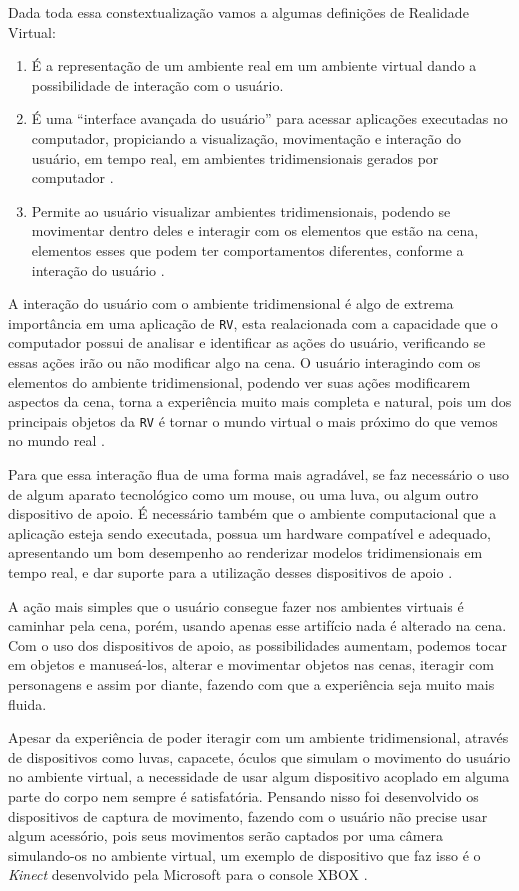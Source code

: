 Dada toda essa constextualização vamos a algumas definições de Realidade Virtual:
\begin{enumerate}
\item É a representação de um ambiente real em um ambiente virtual dando a possibilidade de interação com o usuário.
\item É uma “interface avançada do usuário” para acessar aplicações executadas no computador, propiciando a visualização, movimentação e interação do usuário, em tempo real, em ambientes tridimensionais gerados por computador \cite{kirner2006,kirner2007}.
\item Permite ao usuário visualizar ambientes tridimensionais, podendo se movimentar dentro deles e interagir com os elementos que estão na cena, elementos esses que podem ter comportamentos diferentes, conforme a interação do usuário \cite{kirner2006}.
\end{enumerate}

A interação do usuário com o ambiente tridimensional é algo de extrema importância em uma aplicação de \verb'RV', esta realacionada com a capacidade que o computador possui de analisar e identificar as ações do usuário, verificando se essas ações irão ou não modificar algo na cena. O usuário interagindo com os elementos do ambiente tridimensional, podendo ver suas ações modificarem aspectos da cena, torna a experiência muito mais completa e natural, pois um dos principais objetos da \verb'RV' é tornar o mundo virtual o mais próximo do que vemos no mundo real \cite{kirner2006}.

Para que essa interação flua de uma forma mais agradável, se faz necessário o uso de algum aparato tecnológico como um mouse, ou uma luva, ou algum outro dispositivo de apoio. É necessário também que o ambiente computacional que a aplicação esteja sendo executada, possua um hardware compatível e adequado, apresentando um bom desempenho ao renderizar modelos tridimensionais em tempo real, e dar suporte para a utilização desses dispositivos de apoio \cite{kirner2006}.

A ação mais simples que o usuário consegue fazer nos ambientes virtuais é caminhar pela cena, porém, usando apenas esse artifício nada é alterado na cena. Com o uso dos dispositivos de apoio, as possibilidades aumentam, podemos tocar em objetos e manuseá-los, alterar e movimentar objetos nas cenas, iteragir com personagens e assim por diante, fazendo com que a experiência seja muito mais fluida.

Apesar da experiência de poder iteragir com um ambiente tridimensional, através de dispositivos como luvas, capacete, óculos que simulam o movimento do usuário no ambiente virtual, a necessidade de usar algum dispositivo acoplado em alguma parte do corpo nem sempre é satisfatória. Pensando nisso foi desenvolvido os dispositivos de captura de movimento, fazendo com o usuário não precise usar algum acessório, pois seus movimentos serão captados por uma câmera simulando-os no ambiente virtual, um exemplo de dispositivo que faz isso é o \textit{Kinect} desenvolvido pela Microsoft para o console XBOX \cite{kinect}.

